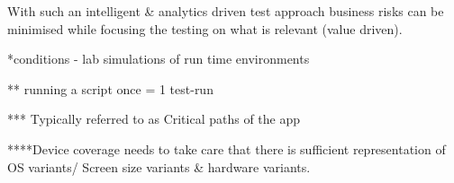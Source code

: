 With such an intelligent & analytics driven test approach business risks can be minimised while focusing the testing on what is relevant (value driven). 





*conditions - lab simulations of run time environments

** running a script once = 1 test-run

*** Typically referred to as Critical paths of the app

****Device coverage needs to take care that there is sufficient representation of OS variants/ Screen size variants & hardware variants.

